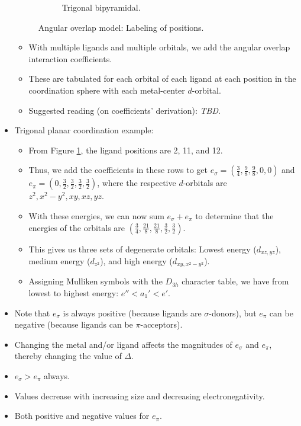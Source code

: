 \documentclass[../notes.tex]{subfiles}
\begin{document}
\begin{itemize}
\begin{figure}[h!]
\begin{subfigure}[b]{0.3\linewidth}
            \caption{Trigonal bipyramidal.}
            \label{fig:AOM-positionLabelingc}
        \end{subfigure}
        \caption{Angular overlap model: Labeling of positions.}
        \label{fig:AOM-positionLabeling}
    \end{figure}
    \begin{itemize}
        \item With multiple ligands and multiple orbitals, we add the angular overlap interaction coefficients.
        \item These are tabulated for each orbital of each ligand at each position in the coordination sphere with each metal-center $d$-orbital.
        \item Suggested reading (on coefficients' derivation): \emph{TBD}.
    \end{itemize}
    \item Trigonal planar coordination example:
    \begin{itemize}
        \item From Figure \ref{fig:AOM-positionLabelingc}, the ligand positions are 2, 11, and 12.
        \item Thus, we add the coefficients in these rows to get $e_\sigma=(\frac{3}{4},\frac{9}{8},\frac{9}{8},0,0)$ and $e_\pi=(0,\frac{3}{2},\frac{3}{2},\frac{3}{2},\frac{3}{2})$, where the respective $d$-orbitals are $z^2,x^2-y^2,xy,xz,yz$.
        \item With these energies, we can now sum $e_\sigma+e_\pi$ to determine that the energies of the orbitals are $(\frac{3}{4},\frac{21}{8},\frac{21}{8},\frac{3}{2},\frac{3}{2})$.
        \item This gives us three sets of degenerate orbitals: Lowest energy ($d_{xz,yz}$), medium energy ($d_{z^2}$), and high energy ($d_{xy,x^2-y^2}$).
        \item Assigning Mulliken symbols with the $D_{3h}$ character table, we have from lowest to highest energy: $e''<a_1'<e'$.
    \end{itemize}
    \item Note that $e_\sigma$ is always positive (because ligands are $\sigma$-donors), but $e_\pi$ can be negative (because ligands can be $\pi$-acceptors).
    \item Changing the metal and/or ligand affects the magnitudes of $e_\sigma$ and $e_\pi$, thereby changing the value of $\Delta$.
    \item $e_\sigma>e_\pi$ always.
    \item Values decrease with increasing size and decreasing electronegativity.
    \item Both positive and negative values for $e_\pi$.
\end{itemize}
\end{document}
